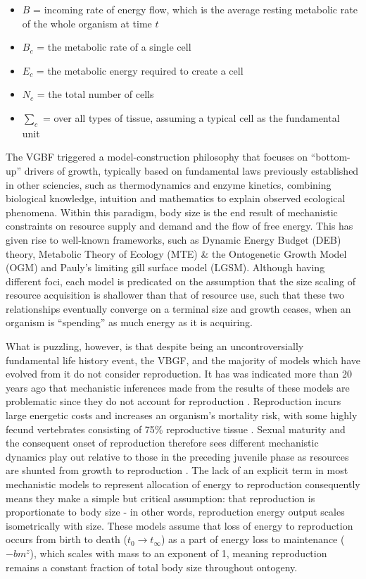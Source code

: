 \documentclass[a4paper]{article} %
\begin{document}
        \begin{itemize}            
            \item $B$ = incoming rate of energy flow, which is the average resting metabolic rate of the whole organism at time $t$
            \item $B_c$ = the metabolic rate of a single cell
            \item $E_c$ = the metabolic energy required to create a cell
            \item $N_c$ = the total number of cells
            \item $\sum\limits_c$ = over all types of tissue, assuming a typical cell as the fundamental unit
        \end{itemize}
        
        The VGBF triggered a model-construction philosophy that focuses on ``bottom-up'' drivers of growth, typically based on fundamental laws previously established in other sciencies, such as thermodynamics and enzyme kinetics, combining biological knowledge, intuition and mathematics to explain observed ecological phenomena. Within this paradigm, body size is the end result of mechanistic constraints on resource supply and demand and the flow of free energy. This has given rise to well-known frameworks, such as Dynamic Energy Budget (DEB) theory, Metabolic Theory of Ecology (MTE) \& the Ontogenetic Growth Model (OGM) and Pauly's limiting gill surface model (LGSM). Although having different foci, each model is predicated on the assumption that the size scaling of resource acquisition is shallower than that of resource use, such that these two relationships eventually converge on a terminal size and growth ceases, when an organism is ``spending'' as much energy as it is acquiring. 
        
        What is puzzling, however, is that despite being an uncontroversially fundamental life history event, the VBGF, and the majority of models which have evolved from it do not consider reproduction. It has was indicated more than 20 years ago that mechanistic inferences made from the results of these models are problematic since they do not account for reproduction \autocite{Day1997, Marshall2019b}. Reproduction incurs large energetic costs and increases an organism's mortality risk, with some highly fecund vertebrates consisting of 75\% reproductive tissue \autocite{Parker2018}. Sexual maturity and the consequent onset of reproduction therefore sees different mechanistic dynamics play out relative to those in the preceding juvenile phase as resources are shunted from growth to reproduction \autocite{Day1997}. The lack of an explicit term in most mechanistic models to represent allocation of energy to reproduction consequently means they make a simple but critical assumption: that reproduction is proportionate to body size - in other words, reproduction energy output scales isometrically with size. These models assume that loss of energy to reproduction occurs from birth to death ($t_0 \rightarrow t_{\infty}$) as a part of energy loss to maintenance ($-bm^z$), which scales with mass to an exponent of 1, meaning reproduction remains a constant fraction of total body size throughout ontogeny.
\end{document}

